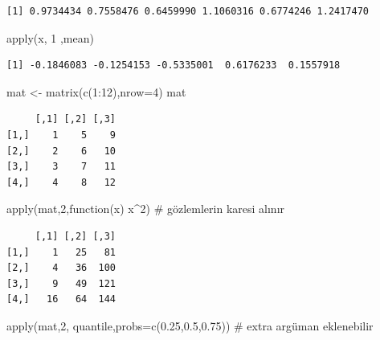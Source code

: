 \documentclass[
  letterpaper,
  DIV=11,
  numbers=noendperiod]{scrreprt}
\newenvironment{Shaded}{\begin{snugshade}}{\end{snugshade}}
\newcommand{\AttributeTok}[1]{\textcolor[rgb]{0.40,0.45,0.13}{#1}}
\newcommand{\CommentTok}[1]{\textcolor[rgb]{0.37,0.37,0.37}{#1}}
\newcommand{\ControlFlowTok}[1]{\textcolor[rgb]{0.00,0.23,0.31}{#1}}
\newcommand{\DecValTok}[1]{\textcolor[rgb]{0.68,0.00,0.00}{#1}}
\newcommand{\FloatTok}[1]{\textcolor[rgb]{0.68,0.00,0.00}{#1}}
\newcommand{\FunctionTok}[1]{\textcolor[rgb]{0.28,0.35,0.67}{#1}}
\newcommand{\NormalTok}[1]{\textcolor[rgb]{0.00,0.23,0.31}{#1}}
\newcommand{\OtherTok}[1]{\textcolor[rgb]{0.00,0.23,0.31}{#1}}
\newcommand{\SpecialCharTok}[1]{\textcolor[rgb]{0.37,0.37,0.37}{#1}}
\begin{document}
\begin{verbatim}
[1] 0.9734434 0.7558476 0.6459990 1.1060316 0.6774246 1.2417470
\end{verbatim}

\begin{Shaded}
\begin{Highlighting}[]
\FunctionTok{apply}\NormalTok{(x, }\DecValTok{1}\NormalTok{ ,mean)}
\end{Highlighting}
\end{Shaded}

\begin{verbatim}
[1] -0.1846083 -0.1254153 -0.5335001  0.6176233  0.1557918
\end{verbatim}

\begin{Shaded}
\begin{Highlighting}[]
\NormalTok{mat }\OtherTok{\textless{}{-}} \FunctionTok{matrix}\NormalTok{(}\FunctionTok{c}\NormalTok{(}\DecValTok{1}\SpecialCharTok{:}\DecValTok{12}\NormalTok{),}\AttributeTok{nrow=}\DecValTok{4}\NormalTok{)}
\NormalTok{mat}
\end{Highlighting}
\end{Shaded}

\begin{verbatim}
     [,1] [,2] [,3]
[1,]    1    5    9
[2,]    2    6   10
[3,]    3    7   11
[4,]    4    8   12
\end{verbatim}

\begin{Shaded}
\begin{Highlighting}[]
\FunctionTok{apply}\NormalTok{(mat,}\DecValTok{2}\NormalTok{,}\ControlFlowTok{function}\NormalTok{(x) x}\SpecialCharTok{\^{}}\DecValTok{2}\NormalTok{) }\CommentTok{\# gözlemlerin karesi alınır}
\end{Highlighting}
\end{Shaded}

\begin{verbatim}
     [,1] [,2] [,3]
[1,]    1   25   81
[2,]    4   36  100
[3,]    9   49  121
[4,]   16   64  144
\end{verbatim}

\begin{Shaded}
\begin{Highlighting}[]
\FunctionTok{apply}\NormalTok{(mat,}\DecValTok{2}\NormalTok{, quantile,}\AttributeTok{probs=}\FunctionTok{c}\NormalTok{(}\FloatTok{0.25}\NormalTok{,}\FloatTok{0.5}\NormalTok{,}\FloatTok{0.75}\NormalTok{)) }\CommentTok{\# extra argüman eklenebilir}
\end{Highlighting}
\end{Shaded}
\end{document}
